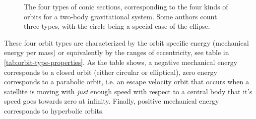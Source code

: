 \begin{figure}[ht]
    \centering
    \hfill
    \caption{The four types of conic sections, corresponding to the four kinds of orbits for a two-body gravitational system. Some authors count three types, with the circle being a special case of the ellipse.}
    \label{fig:conics-and-orbits}
\end{figure}

These four orbit types are characterized by the orbit specific energy (mechanical energy per mass) or equivalently by the ranges of eccentricity, see table in \cref{tab:orbit-type-properties}. As the table shows, a negative mechanical energy corresponds to a closed orbit (either circular or elliptical), zero energy corresponds to a parabolic orbit, i.e. an escape velocity orbit that occurs when a satellite is moving with \emph{just} enough speed with respect to a central body that it's speed goes towards zero at infinity. Finally, positive mechanical energy corresponds to hyperbolic orbits.

